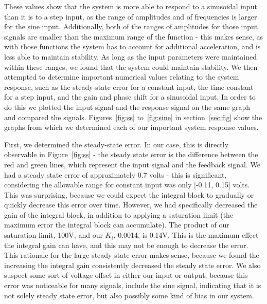 \documentclass{article}
\begin{document}
These values show that the system is more able to respond to a sinusoidal input than it is to a step input, as the range of amplitudes and of frequencies is larger for the sine input.  Additionally, both of the ranges of amplitudes for those input signals are smaller than the maximum range of the function - this makes sense, as with those functions the system has to account for additional acceleration, and is less able to maintain stability.  As long as the input parameters were maintained within these ranges, we found that the system could maintain stability.  We then attempted to determine important numerical values relating to the system response, such as the steady-state error for a constant input, the time constant for a step input, and the gain and phase shift for a sinusoidal input.  In order to do this we plotted the input signal and the response signal on the same graph and compared the signals.  Figures~\ref{fig:ss} to~\ref{fig:sine} in section~\ref{sec:fig} show the graphs from which we determined each of our important system response values. 

First, we determined the steady-state error.  In our case, this is directly observable in Figure~\ref{fig:ss} - the steady state error is the difference between the red and green lines, which represent the input signal and the feedback signal.  We had a steady state error of approximately 0.7 volts - this is significant, considering the allowable range for constant input was only [-0.11, 0.15] volts.  This was surprising, because we could expect the integral block to gradually or quickly decrease this error over time.  However, we had specifically decreased the gain of the integral block, in addition to applying a saturation limit (the maximum error the integral block can accumulate).  The product of our saturation limit, 100V, and our $K_i$, 0.0014, is 0.14V.  This is the maximum effect the integral gain can have, and this may not be enough to decrease the error.  This rationale for the large steady state error makes sense, because we found the increasing the integral gain consistently decreased the steady state error.  We also suspect some sort of voltage offset in either our input or output, because this error was noticeable for many signals, include the sine signal, indicating that it is not solely steady state error, but also possibly some kind of bias in our system.
\end{document}
